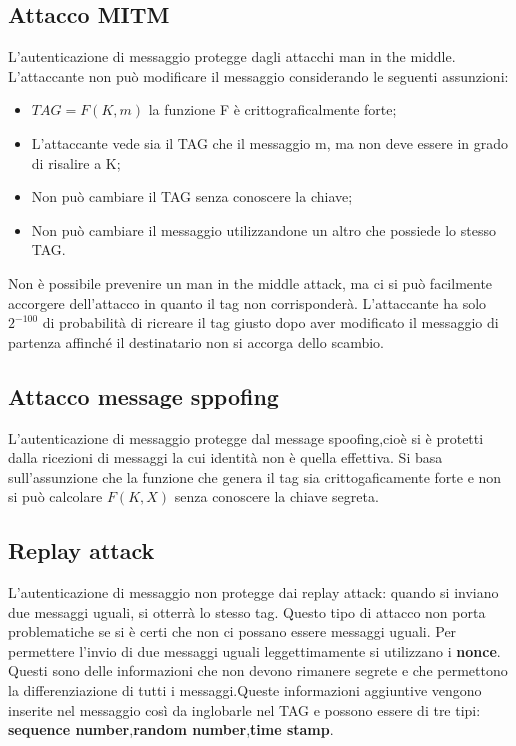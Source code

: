 \documentclass{article}
\theoremstyle{remark}
\begin{document}
\subsection{Attacco MITM}
L'autenticazione di messaggio protegge dagli attacchi man in the middle. L'attaccante non può modificare il messaggio considerando le seguenti assunzioni:
\begin{itemize}
    \item $TAG=F(K,m)$ la funzione F è crittograficalmente forte;
    \item L'attaccante vede sia il TAG che il messaggio m, ma non deve essere in grado di risalire a K;
    \item Non può cambiare il TAG senza conoscere la chiave;
    \item Non può cambiare il messaggio utilizzandone un altro che possiede lo stesso TAG.
\end{itemize}
Non è possibile prevenire un man in the middle attack, ma ci si può facilmente accorgere dell'attacco in quanto il tag non corrisponderà. L'attaccante ha solo $2^{-100}$ di probabilità di ricreare il tag giusto dopo aver modificato il messaggio di partenza affinché il destinatario non si accorga dello scambio.
\subsection{Attacco message sppofing}
L'autenticazione di messaggio protegge dal message spoofing,cioè si è protetti dalla ricezioni di messaggi la cui identità non è quella effettiva. Si basa sull'assunzione che la funzione che genera il tag sia crittogaficamente forte e non si può calcolare $F(K,X)$ senza conoscere la chiave segreta.
\subsection{Replay attack}
L'autenticazione di messaggio non protegge dai replay attack: quando si inviano due messaggi uguali, si otterrà lo stesso tag. Questo tipo di attacco non porta problematiche se si è certi che non ci possano essere messaggi uguali.
Per permettere l'invio di due messaggi uguali leggettimamente si utilizzano i \textbf{nonce}. Questi sono delle informazioni che non devono rimanere segrete e che permettono la differenziazione di tutti i messaggi.\newline Queste informazioni aggiuntive vengono inserite nel messaggio così da inglobarle nel TAG e possono essere di tre tipi: \textbf{sequence number},\textbf{random number},\textbf{time stamp}.
\end{document}
